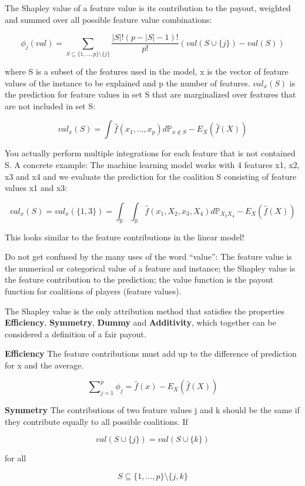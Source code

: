 \documentclass[
  11pt,
]{scrbook}
\begin{document}
The Shapley value of a feature value is its contribution to the payout, weighted and summed over all possible feature value combinations:

\[\phi_j(val)=\sum_{S\subseteq\{1,\ldots,p\}\setminus\{j\}}\frac{|S|!\left(p-|S|-1\right)!}{p!}\left(val\left(S\cup\{j\}\right)-val(S)\right)\]

where S is a subset of the features used in the model, x is the vector of feature values of the instance to be explained and p the number of features.
\(val_x(S)\) is the prediction for feature values in set S that are marginalized over features that are not included in set S:

\[val_{x}(S)=\int\hat{f}(x_{1},\ldots,x_{p})d\mathbb{P}_{x\notin{}S}-E_X(\hat{f}(X))\]

You actually perform multiple integrations for each feature that is not contained S.
A concrete example:
The machine learning model works with 4 features x1, x2, x3 and x4 and we evaluate the prediction for the coalition S consisting of feature values x1 and x3:

\[val_{x}(S)=val_{x}(\{1,3\})=\int_{\mathbb{R}}\int_{\mathbb{R}}\hat{f}(x_{1},X_{2},x_{3},X_{4})d\mathbb{P}_{X_2X_4}-E_X(\hat{f}(X))\]

This looks similar to the feature contributions in the linear model!

Do not get confused by the many uses of the word ``value'':
The feature value is the numerical or categorical value of a feature and instance;
the Shapley value is the feature contribution to the prediction;
the value function is the payout function for coalitions of players (feature values).

The Shapley value is the only attribution method that satisfies the properties \textbf{Efficiency}, \textbf{Symmetry}, \textbf{Dummy} and \textbf{Additivity}, which together can be considered a definition of a fair payout.

\textbf{Efficiency}
The feature contributions must add up to the difference of prediction for x and the average.

\[\sum\nolimits_{j=1}^p\phi_j=\hat{f}(x)-E_X(\hat{f}(X))\]

\textbf{Symmetry}
The contributions of two feature values j and k should be the same if they contribute equally to all possible coalitions.
If

\[val(S \cup \{j\})=val(S\cup\{k\})\]

for all

\[S\subseteq\{1,\ldots, p\}\setminus\{j,k\}\]
\end{document}
